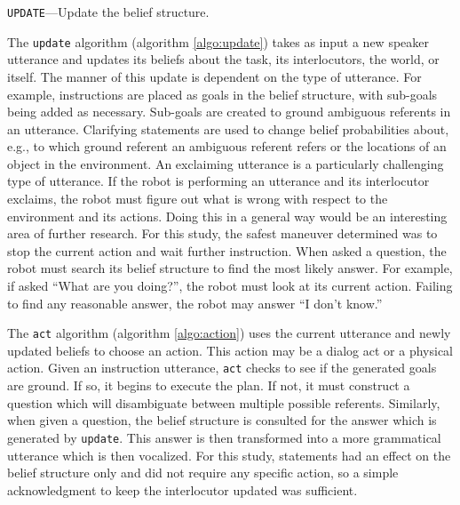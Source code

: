 \documentclass[12pt]{article}
\begin{document}
\begin{algorithm}
  \DontPrintSemicolon
  \caption{\texttt{UPDATE}---Update the belief structure.}
  \label{algo:update}
\end{algorithm}

The \texttt{update} algorithm (algorithm \ref{algo:update}) takes
as input a new speaker utterance and updates its beliefs about the
task, its interlocutors, the world, or itself. The manner of this
update is dependent on the type of utterance. For example,
instructions are placed as goals in the belief structure, with
sub-goals being added as necessary. Sub-goals are created to ground
ambiguous referents in an utterance. Clarifying statements are used to
change belief probabilities about, e.g., to which ground referent an
ambiguous referent refers or the locations of an object in the
environment. An exclaiming utterance is a particularly challenging
type of utterance. If the robot is performing an utterance and its
interlocutor exclaims, the robot must figure out what is wrong with
respect to the environment and its actions. Doing this in a general
way would be an interesting area of further research. For this study,
the safest maneuver determined was to stop the current action and wait
further instruction. When asked a question, the robot must search its
belief structure to find the most likely answer. For example, if asked
``What are you doing?'', the robot must look at its current
action. Failing to find any reasonable answer, the robot may answer
``I don't know.''

The \texttt{act} algorithm (algorithm \ref{algo:action}) uses the
current utterance and newly updated beliefs to choose an action. This
action may be a dialog act or a physical action. Given an instruction
utterance, \texttt{act} checks to see if the generated goals are
ground. If so, it begins to execute the plan. If not, it must
construct a question which will disambiguate between multiple possible
referents. Similarly, when given a question, the belief structure is
consulted for the answer which is generated by \texttt{update}. This
answer is then transformed into a more grammatical utterance which is
then vocalized. For this study, statements had an effect on the belief
structure only and did not require any specific action, so a simple
acknowledgment to keep the interlocutor updated was sufficient.
\end{document}
